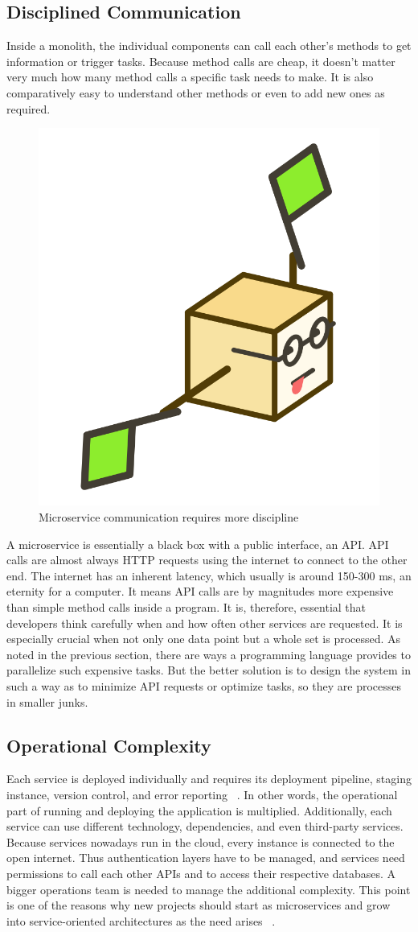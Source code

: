 \subsection{Disciplined Communication}
\label{sec:theory:challenges:communication}

Inside a monolith, the individual components can call each other's methods to get information or trigger tasks. Because method calls are cheap, it doesn't matter very much how many method calls a specific task needs to make. It is also comparatively easy to understand other methods or even to add new ones as required.

\begin{figure}[ht]
  \centering
  \includegraphics[width=0.25\linewidth]{assets/illustration-microservice-flags.png}
  \caption{Microservice communication requires more discipline}
\end{figure}

A microservice is essentially a black box with a public interface, an API. API calls are almost always HTTP requests using the internet to connect to the other end. The internet has an inherent latency, which usually is around 150-300 ms, an eternity for a computer. It means API calls are by magnitudes more expensive than simple method calls inside a program. It is, therefore, essential that developers think carefully when and how often other services are requested. It is especially crucial when not only one data point but a whole set is processed. As noted in the previous section, there are ways a programming language provides to parallelize such expensive tasks. But the better solution is to design the system in such a way as to minimize API requests or optimize tasks, so they are processes in smaller junks.


\subsection{Operational Complexity}
\label{sec:theory:challenges:ops}

Each service is deployed individually and requires its deployment pipeline, staging instance, version control, and error reporting ~\cite{fachat.2019.1}. In other words, the operational part of running and deploying the application is multiplied. Additionally, each service can use different technology, dependencies, and even third-party services. Because services nowadays run in the cloud, every instance is connected to the open internet. Thus authentication layers have to be managed, and services need permissions to call each other APIs and to access their respective databases. A bigger operations team is needed to manage the additional complexity. This point is one of the reasons why new projects should start as microservices and grow into service-oriented architectures as the need arises ~\cite{krivtsov.2019}.

